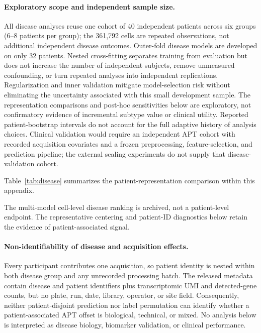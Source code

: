 \documentclass{article} %
\begin{document}


\paragraph{Exploratory scope and independent sample size.}
All disease analyses reuse one cohort of 40 independent patients across six
groups (6--8 patients per group); the 361{,}792 cells are repeated observations,
not additional independent disease outcomes. Outer-fold disease models are
developed on only 32 patients. Nested cross-fitting separates training from
evaluation but does not increase the number of independent subjects, remove
unmeasured confounding, or turn repeated analyses into independent replications.
Regularization and inner validation mitigate model-selection risk without
eliminating the uncertainty associated with this small development sample.
The representation comparisons and post-hoc sensitivities below are exploratory,
not confirmatory evidence of incremental subtype value or clinical utility.
Reported patient-bootstrap intervals do not account for the full adaptive
history of analysis choices. Clinical validation would require an independent
APT cohort with recorded acquisition covariates and a frozen preprocessing,
feature-selection, and prediction pipeline; the external scaling experiments
do not supply that disease-validation cohort.

Table~\ref{tab:disease} summarizes the patient-representation comparison
within this appendix.

The multi-model cell-level disease ranking is archived, not a patient-level
endpoint. The representative centering and patient-ID diagnostics below
retain the evidence of patient-associated signal.

\paragraph{Non-identifiability of disease and acquisition effects.}
Every participant contributes one acquisition, so patient identity is nested
within both disease group and any unrecorded processing batch. The released
metadata contain disease and patient identifiers plus transcriptomic UMI and
detected-gene counts, but no plate, run, date, library, operator, or site field.
Consequently, neither patient-disjoint prediction nor label permutation can
identify whether a patient-associated APT offset is biological, technical, or
mixed. No analysis below is interpreted as disease biology, biomarker
validation, or clinical performance.
\end{document}
